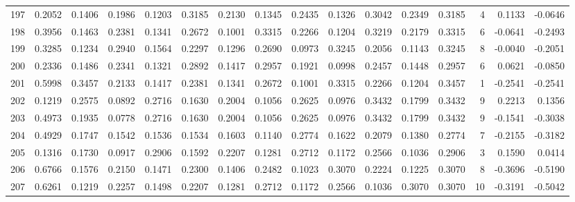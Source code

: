 \begin{tabular}{lrrrrrrrrrrrrrrr}
197 &      0.2052 &  0.1406 &  0.1986 &  0.1203 &  0.3185 &  0.2130 &  0.1345 &  0.2435 &  0.1326 &  0.3042 &   0.2349 &     0.3185 &      4 &                    0.1133 &                    -0.0646 \\
198 &      0.3956 &  0.1463 &  0.2381 &  0.1341 &  0.2672 &  0.1001 &  0.3315 &  0.2266 &  0.1204 &  0.3219 &   0.2179 &     0.3315 &      6 &                   -0.0641 &                    -0.2493 \\
199 &      0.3285 &  0.1234 &  0.2940 &  0.1564 &  0.2297 &  0.1296 &  0.2690 &  0.0973 &  0.3245 &  0.2056 &   0.1143 &     0.3245 &      8 &                   -0.0040 &                    -0.2051 \\
200 &      0.2336 &  0.1486 &  0.2341 &  0.1321 &  0.2892 &  0.1417 &  0.2957 &  0.1921 &  0.0998 &  0.2457 &   0.1448 &     0.2957 &      6 &                    0.0621 &                    -0.0850 \\
201 &      0.5998 &  0.3457 &  0.2133 &  0.1417 &  0.2381 &  0.1341 &  0.2672 &  0.1001 &  0.3315 &  0.2266 &   0.1204 &     0.3457 &      1 &                   -0.2541 &                    -0.2541 \\
202 &      0.1219 &  0.2575 &  0.0892 &  0.2716 &  0.1630 &  0.2004 &  0.1056 &  0.2625 &  0.0976 &  0.3432 &   0.1799 &     0.3432 &      9 &                    0.2213 &                     0.1356 \\
203 &      0.4973 &  0.1935 &  0.0778 &  0.2716 &  0.1630 &  0.2004 &  0.1056 &  0.2625 &  0.0976 &  0.3432 &   0.1799 &     0.3432 &      9 &                   -0.1541 &                    -0.3038 \\
204 &      0.4929 &  0.1747 &  0.1542 &  0.1536 &  0.1534 &  0.1603 &  0.1140 &  0.2774 &  0.1622 &  0.2079 &   0.1380 &     0.2774 &      7 &                   -0.2155 &                    -0.3182 \\
205 &      0.1316 &  0.1730 &  0.0917 &  0.2906 &  0.1592 &  0.2207 &  0.1281 &  0.2712 &  0.1172 &  0.2566 &   0.1036 &     0.2906 &      3 &                    0.1590 &                     0.0414 \\
206 &      0.6766 &  0.1576 &  0.2150 &  0.1471 &  0.2300 &  0.1406 &  0.2482 &  0.1023 &  0.3070 &  0.2224 &   0.1225 &     0.3070 &      8 &                   -0.3696 &                    -0.5190 \\
207 &      0.6261 &  0.1219 &  0.2257 &  0.1498 &  0.2207 &  0.1281 &  0.2712 &  0.1172 &  0.2566 &  0.1036 &   0.3070 &     0.3070 &     10 &                   -0.3191 &                    -0.5042 \\

\end{tabular}

